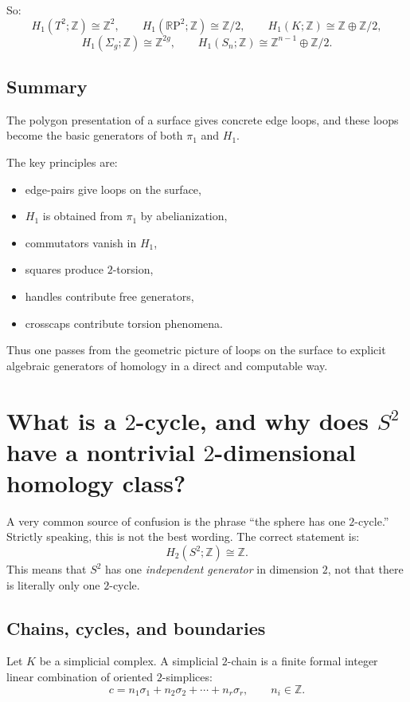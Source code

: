 \documentclass[12pt,a4paper]{article}
\newcommand{\RP}{\mathbb{R}\mathrm{P}}
\newcommand{\Z}{\mathbb{Z}}
\theoremstyle{notespace}
\begin{document}
So:
\[
H_1(T^2;\Z)\cong \Z^2,
\qquad
H_1(\RP^2;\Z)\cong \Z/2,
\qquad
H_1(K;\Z)\cong \Z\oplus \Z/2,
\]
\[
H_1(\Sigma_g;\Z)\cong \Z^{2g},
\qquad
H_1(S_n;\Z)\cong \Z^{n-1}\oplus \Z/2.
\]

\subsection{Summary}

The polygon presentation of a surface gives concrete edge loops, and these loops become the basic generators of both \(\pi_1\) and \(H_1\).

The key principles are:
\begin{itemize}
	\item edge-pairs give loops on the surface,
	\item \(H_1\) is obtained from \(\pi_1\) by abelianization,
	\item commutators vanish in \(H_1\),
	\item squares produce \(2\)-torsion,
	\item handles contribute free generators,
	\item crosscaps contribute torsion phenomena.
\end{itemize}

Thus one passes from the geometric picture of loops on the surface to explicit algebraic generators of homology in a direct and computable way.

\section{What is a \(2\)-cycle, and why does \(S^2\) have a nontrivial \(2\)-dimensional homology class?}

A very common source of confusion is the phrase ``the sphere has one \(2\)-cycle.''  
Strictly speaking, this is not the best wording. The correct statement is:
\[
H_2(S^2;\Z)\cong \Z.
\]
This means that \(S^2\) has one \emph{independent generator} in dimension \(2\), not that there is literally only one \(2\)-cycle.

\subsection{Chains, cycles, and boundaries}

Let \(K\) be a simplicial complex. A simplicial \(2\)-chain is a finite formal integer linear combination of oriented \(2\)-simplices:
\[
c=n_1\sigma_1+n_2\sigma_2+\cdots+n_r\sigma_r,
\qquad n_i\in \Z.
\]
\end{document}
